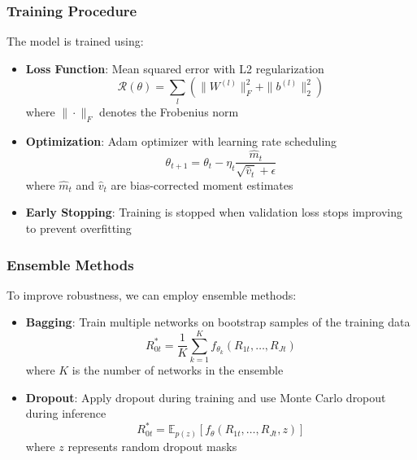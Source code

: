 \documentclass[12pt,article]{memoir}
\begin{document}
\subsubsection{Training Procedure}
The model is trained using:
\begin{itemize}
   \item \textbf{Loss Function}: Mean squared error with L2 regularization
   $$\mathcal{R}(\theta) = \sum_{l} (\|W^{(l)}\|_F^2 + \|b^{(l)}\|_2^2)$$
   where $\|\cdot\|_F$ denotes the Frobenius norm
   
   \item \textbf{Optimization}: Adam optimizer with learning rate scheduling
   $$\theta_{t+1} = \theta_t - \eta_t \frac{\hat{m}_t}{\sqrt{\hat{v}_t} + \epsilon}$$
   where $\hat{m}_t$ and $\hat{v}_t$ are bias-corrected moment estimates
   
   \item \textbf{Early Stopping}: Training is stopped when validation loss stops improving to prevent overfitting
\end{itemize}

\subsubsection{Ensemble Methods}
To improve robustness, we can employ ensemble methods:

\begin{itemize}
   \item \textbf{Bagging}: Train multiple networks on bootstrap samples of the training data
   $$R_{0t}^* = \frac{1}{K}\sum_{k=1}^K f_{\theta_k}(R_{1t},\ldots,R_{Jt})$$
   where $K$ is the number of networks in the ensemble
   
   \item \textbf{Dropout}: Apply dropout during training and use Monte Carlo dropout during inference
   $$R_{0t}^* = \mathbb{E}_{p(z)}[f_{\theta}(R_{1t},\ldots,R_{Jt},z)]$$
   where $z$ represents random dropout masks
\end{itemize}

\end{document}
